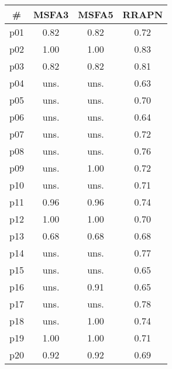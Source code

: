 \begin{tabular}{c||c|c|c}
\textbf{\#} & \textbf{MSFA3} & \textbf{MSFA5} & \textbf{RRAPN}\\
\hline
\hline
p01 & 0.82 & 0.82 & 0.72\\
p02 & 1.00 & 1.00 & 0.83\\
p03 & 0.82 & 0.82 & 0.81\\
p04 & uns. & uns. & 0.63\\
p05 & uns. & uns. & 0.70\\
p06 & uns. & uns. & 0.64\\
p07 & uns. & uns. & 0.72\\
p08 & uns. & uns. & 0.76\\
p09 & uns. & 1.00 & 0.72\\
p10 & uns. & uns. & 0.71\\
p11 & 0.96 & 0.96 & 0.74\\
p12 & 1.00 & 1.00 & 0.70\\
p13 & 0.68 & 0.68 & 0.68\\
p14 & uns. & uns. & 0.77\\
p15 & uns. & uns. & 0.65\\
p16 & uns. & 0.91 & 0.65\\
p17 & uns. & uns. & 0.78\\
p18 & uns. & 1.00 & 0.74\\
p19 & 1.00 & 1.00 & 0.71\\
p20 & 0.92 & 0.92 & 0.69\\
\end{tabular}

